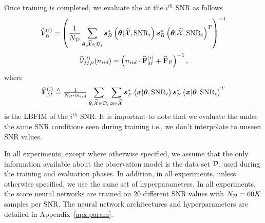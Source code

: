 Once training is completed, we evaluate 
the \name{} %
{at the $i^{th}$ SNR as follows}
\begin{equation*}
    \widehat{\mathcal{V}}_{B}^{(i)}=\left(\frac{1}{N_{\mathcal{D}}}\sum_{\bm{\theta},\widetilde{\mathcal{X}}\in\mathcal{D}_i}\bm{s}_{B}^*\left(\bm{\theta}|\widetilde{\mathcal{X}},\mathrm{SNR}_i\right)\bm{s}_{B}^*\left(\bm{\theta}|\widetilde{\mathcal{X}},\mathrm{SNR}_i\right)^T\right)^{-1}
\end{equation*}
\begin{equation}
    \widehat{\mathcal{V}}_{MP}^{(i)}{(n_{iid})} =\left(n_{iid}\cdot  \widehat{\mathbf{F}}_{M}^{(i)}+ \widehat{\mathbf{F}}_{P}\right)^{-1},
\end{equation}
where 
{
        \begin{equation*}
     \widehat{\mathbf{F}}_{M}^{(i)}\triangleq     \tfrac{1}{N_{\mathcal{D}}\cdot m_{iid}} \sum_{\bm{\theta},\widetilde{\mathcal{X}}\in\mathcal{D}_i} \sum_{\bm{x}\in\widetilde{\mathcal{X}}}\bm{s}_{F}^*\left(\bm{x}|\bm{\theta}, \mathrm{SNR}_i\right)\bm{s}_{F}^*\left(\bm{x}|\bm{\theta}, \mathrm{SNR}_i\right)^T   
        \end{equation*} 
        }
is the LBFIM of the $i^{th}$ SNR. It is important to note that we evaluate the \name{} under the same SNR conditions seen during training %
{i.e., we don't interpolate to unseen SNR values}. 

In all experiments, except where otherwise specified, we %
assume that the only information available about the observation model is the data set $\mathcal{D}$, used during the training and evaluation phases. %
{In addition, in all experiments, unless otherwise specified, we use the same set of hyperparameters. %
In all experiments, the score neural networks are trained on 20 different SNR values with $N_{\mathcal{D}}=60K$ samples 
per SNR.  } The %
neural network architectures and
hyperparameters %
are detailed in Appendix~\ref{apx:param}.


